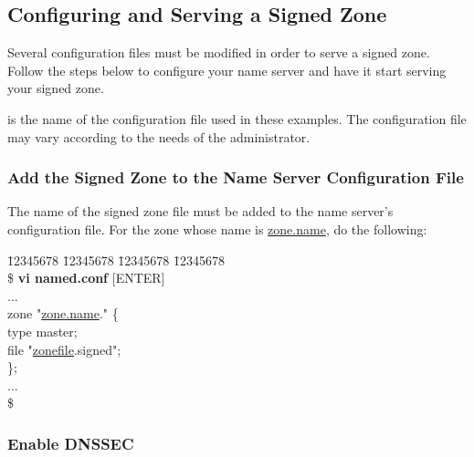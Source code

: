 
\clearpage
\subsection{Configuring and Serving a Signed Zone}
\label{config-n-serve}

Several configuration files must be modified in order to serve a signed zone.
Follow the steps below to configure your name server and have it start
serving your signed zone.

 is the name of the configuration file used in these examples.
The configuration file may vary according to the needs of the administrator.


\subsubsection{Add the Signed Zone to the Name Server Configuration File}

The name of the signed zone file must be added to the name server's
configuration file.  For the zone whose name is \underline{zone.name},
do the following:
\begin{tabbing}
\hspace{0.5in} \= 12345678 \= 12345678 \= 12345678 \= 12345678 \kill \\
\hspace{0.5in}\$ {\bf vi named.conf} $[$ENTER$]$ \\
\hspace{0.5in} ... \\
\hspace{0.5in} zone "\underline{zone.name}." \{ \\
\hspace{0.5in} \> \> type master; \\
\hspace{0.5in} \> \> file "\underline{zonefile}.signed"; \\
\hspace{0.5in} \}; \\
\hspace{0.5in} ... \\
\hspace{0.5in}\$ \\
\end{tabbing}


\subsubsection{Enable DNSSEC}

